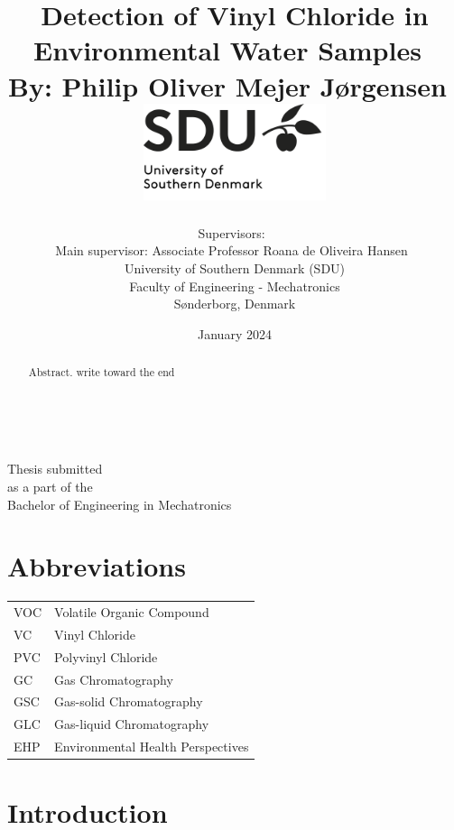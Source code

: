 \documentclass{article}
\title{\textbf{Detection of Vinyl Chloride in Environmental Water Samples}~\\[5mm]
\large{By: Philip Oliver Mejer Jørgensen}~\\[5mm]
\includegraphics[width=0.4\textwidth]{sdulogo.png}}
\author{
Supervisors:~\\[3mm]
Main supervisor: Associate Professor Roana de Oliveira Hansen~\\[15mm]
University of Southern Denmark (SDU)\\
Faculty of Engineering - Mechatronics\\
Sønderborg, Denmark
}
\date{January 2024}
\begin{document}
\maketitle
~\\[2mm]
\begin{center}
\large{
Thesis submitted\\
as a part of the\\
Bachelor of Engineering in Mechatronics
}
\end{center}
\thispagestyle{empty}
\newpage

\begin{abstract}
Abstract. write toward the end
\end{abstract}

\listoffigures

\section*{Abbreviations}
\begin{tabular}{ll}
VOC     & Volatile Organic Compound \\
VC      & Vinyl Chloride \\
PVC     & Polyvinyl Chloride \\
GC      & Gas Chromatography \\
GSC     & Gas-solid Chromatography \\
GLC     & Gas-liquid Chromatography \\
EHP     & Environmental Health Perspectives \\
\end{tabular}
\newpage

\tableofcontents

\newpage




\section{Introduction}
\end{document}
